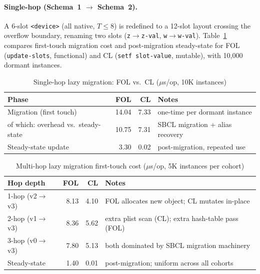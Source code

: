 \documentclass[sigconf,nonacm]{acmart}
\begin{document}
\paragraph{Single-hop (Schema~1 $\to$ Schema~2).}
A 6-slot \texttt{<device>} (all native, $T\leq8$) is redefined to a 12-slot layout crossing the overflow boundary, renaming two slots (\texttt{z}$\to$\texttt{z-val}, \texttt{w}$\to$\texttt{w-val}).
Table~\ref{tab:schema-evo-single} compares first-touch migration cost and post-migration steady-state for FOL (\texttt{update-slots}, functional) and CL (\texttt{setf slot-value}, mutable), with 10{,}000 dormant instances.

\begin{table}[htbp]
\small
\centering
\caption{Single-hop lazy migration: FOL vs.\ CL ($\mu$s/op, 10K instances)}
\label{tab:schema-evo-single}
\begin{tabularx}{\columnwidth}{>{\raggedright\arraybackslash\hsize=0.6\hsize}X r r >{\raggedright\arraybackslash\hsize=1.4\hsize}X}
\toprule
\textbf{Phase} & \textbf{FOL} & \textbf{CL} & \textbf{Notes} \\
\midrule
Migration (first touch) & 14.04 & 7.33 & one-time per dormant instance \\
\quad of which: overhead vs.\ steady-state & 10.75 & 7.31 & SBCL migration + alias recovery \\
Steady-state update & 3.30 & 0.02 & post-migration, repeated use \\
\bottomrule
\end{tabularx}
\end{table}

\begin{table}[htbp]
\small
\centering
\caption{Multi-hop lazy migration first-touch cost ($\mu$s/op, 5K instances per cohort)}
\label{tab:schema-evo-multi}
\begin{tabularx}{\columnwidth}{lrrX}
\toprule
\textbf{Hop depth} & \textbf{FOL} & \textbf{CL} & \textbf{Notes} \\
\midrule
1-hop (v2$\to$v3) & 8.13 & 4.10 & FOL allocates new object; CL mutates in-place \\
2-hop (v1$\to$v3) & 8.36 & 5.62 & extra plist scan (CL); extra hash-table pass (FOL) \\
3-hop (v0$\to$v3) & 7.80 & 5.13 & both dominated by SBCL migration machinery \\
\midrule
Steady-state & 1.40 & 0.01 & post-migration; uniform across all cohorts \\
\bottomrule
\end{tabularx}
\end{table}
\end{document}
